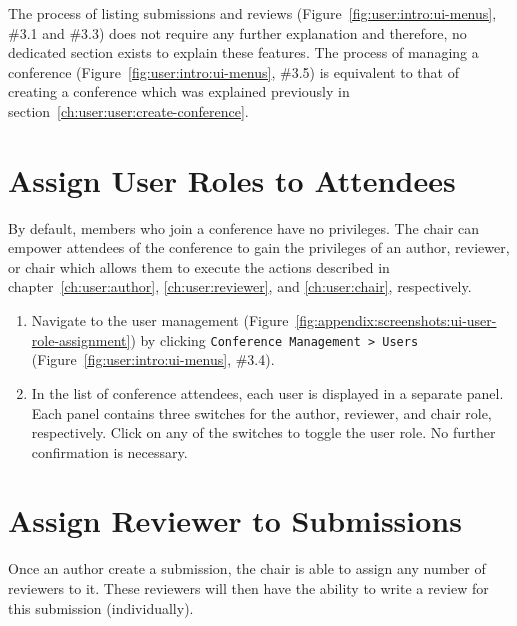 \documentclass[nochapterpage,nopartpage,noheadingspace,numbersubsubsec,bigchapter,colorback,accentcolor=tud9c,10pt]{tudreport}
\begin{document}
    The process of listing submissions and reviews (Figure~\ref{fig:user:intro:ui-menus}, \#3.1 and \#3.3) does not require any further explanation and therefore, no dedicated section exists to explain these features. The process of managing a conference (Figure~\ref{fig:user:intro:ui-menus}, \#3.5) is equivalent to that of creating a conference which was explained previously in section~\ref{ch:user:user:create-conference}.

  \section{Assign User Roles to Attendees}
  \label{ch:user:chair:assign-roles}

    By default, members who join a conference have no privileges. The chair can empower attendees of the conference to gain the privileges of an author, reviewer, or chair which allows them to execute the actions described in chapter~\ref{ch:user:author}, \ref{ch:user:reviewer}, and \ref{ch:user:chair}, respectively.

        \begin{enumerate}
            \setlength\itemsep{0em}
            \item Navigate to the user management (Figure~\ref{fig:appendix:screenshots:ui-user-role-assignment}) by clicking \texttt{Conference Management > Users} (Figure~\ref{fig:user:intro:ui-menus}, \#3.4).
            \item In the list of conference attendees, each user is displayed in a separate panel. Each panel contains three switches for the author, reviewer, and chair role, respectively. Click on any of the switches to toggle the user role. No further confirmation is necessary.
        \end{enumerate}

  \section{Assign Reviewer to Submissions}
  \label{ch:user:chair:assign-reviewer}

    Once an author create a submission, the chair is able to assign any number of reviewers to it. These reviewers will then have the ability to write a review for this submission (individually).
\end{document}

